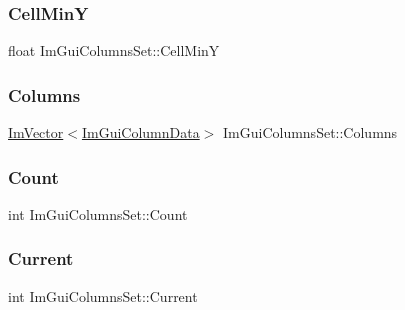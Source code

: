 \hypertarget{struct_im_gui_columns_set_ac7d198911e64be8c9ae7590cf1a91965}{}\label{struct_im_gui_columns_set_ac7d198911e64be8c9ae7590cf1a91965} 
\subsubsection{\texorpdfstring{Cell\+MinY}{CellMinY}}
{\footnotesize\ttfamily float Im\+Gui\+Columns\+Set\+::\+Cell\+MinY}

\hypertarget{struct_im_gui_columns_set_a7922acd94294791c3babf3ee92896d08}{}\label{struct_im_gui_columns_set_a7922acd94294791c3babf3ee92896d08} 
\subsubsection{\texorpdfstring{Columns}{Columns}}
{\footnotesize\ttfamily \hyperlink{class_im_vector}{Im\+Vector}$<$\hyperlink{struct_im_gui_column_data}{Im\+Gui\+Column\+Data}$>$ Im\+Gui\+Columns\+Set\+::\+Columns}

\hypertarget{struct_im_gui_columns_set_aaa3e86fc2582a6bb749172a04b9d934c}{}\label{struct_im_gui_columns_set_aaa3e86fc2582a6bb749172a04b9d934c} 
\subsubsection{\texorpdfstring{Count}{Count}}
{\footnotesize\ttfamily int Im\+Gui\+Columns\+Set\+::\+Count}

\hypertarget{struct_im_gui_columns_set_a6a8816ed50ec3ca5d673b25b667d845f}{}\label{struct_im_gui_columns_set_a6a8816ed50ec3ca5d673b25b667d845f} 
\subsubsection{\texorpdfstring{Current}{Current}}
{\footnotesize\ttfamily int Im\+Gui\+Columns\+Set\+::\+Current}

\hypertarget{struct_im_gui_columns_set_adb2a5aea8ba94e54502d71844ec3e23b}{}\label{struct_im_gui_columns_set_adb2a5aea8ba94e54502d71844ec3e23b} 
